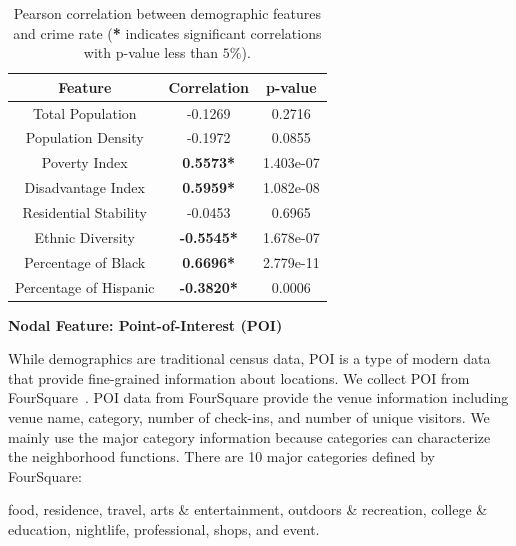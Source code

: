 \begin{table}[h]
\centering
\caption{Pearson correlation between demographic features  and crime rate (\textbf{*} indicates significant correlations with p-value less than $5\%$). }
\vspace{2mm}
\begin{tabular}{|c||c|c|}
\hline
Feature & Correlation & p-value \\ \hline \hline
Total Population & -0.1269 &  0.2716 \\ \hline
Population Density & -0.1972  & 0.0855 \\ \hline
Poverty Index & \textbf{0.5573*} & 1.403e-07 \\ \hline
Disadvantage Index & \textbf{0.5959*} & 1.082e-08 \\ \hline
Residential Stability  & -0.0453 &  0.6965 \\ \hline
Ethnic Diversity & \textbf{-0.5545*} &  1.678e-07 \\ \hline
Percentage of Black & \textbf{0.6696*} &  2.779e-11 \\ \hline
Percentage of Hispanic  & \textbf{-0.3820*} &  0.0006 \\ \hline
\end{tabular}
\label{tb:demo}

\end{table}







\textbf{Nodal Feature: Point-of-Interest (POI)}

While demographics are traditional census data, POI is a type of  modern data that provide fine-grained information about locations. We collect POI from FourSquare~\cite{poi-data}. POI data from FourSquare provide the venue information including venue name, category, number of check-ins, and number of unique visitors. We mainly use the major category information because categories can characterize the neighborhood functions. There are 10 major categories defined by FourSquare:

\textsf{food, residence, travel, arts \& entertainment, outdoors \& recreation, college \& education, nightlife, professional, shops, and event.}


